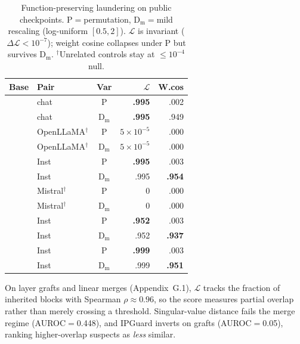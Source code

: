 \documentclass[letterpaper]{article}
\begin{document}
\begin{table}[t]
\centering
\small
\begin{tabular*}{\columnwidth}{@{\extracolsep{\fill}}llcrr@{}}
\toprule
Base & Pair & Var & $\mathcal{L}$ & W.cos \\
\midrule
{}
  & chat & P & \textbf{.995} & .002 \\
  & chat & D$_{\mathrm{m}}$ & \textbf{.995} & .949 \\
  & OpenLLaMA$^\dagger$ & P & $5{\times}10^{-5}$ & .000 \\
  & OpenLLaMA$^\dagger$ & D$_{\mathrm{m}}$ & $5{\times}10^{-5}$ & .000 \\
\midrule
{}
  & Inst & P & \textbf{.995} & .003 \\
  & Inst & D$_{\mathrm{m}}$ & .995 & \textbf{.954} \\
  & Mistral$^\dagger$ & P & $0$ & .000 \\
  & Mistral$^\dagger$ & D$_{\mathrm{m}}$ & $0$ & .000 \\
\midrule
{}
  & Inst & P & \textbf{.952} & .003 \\
  & Inst & D$_{\mathrm{m}}$ & .952 & \textbf{.937} \\
\midrule
{}
  & Inst & P & \textbf{.999} & .003 \\
  & Inst & D$_{\mathrm{m}}$ & .999 & \textbf{.951} \\
\bottomrule
\end{tabular*}
\caption{Function-preserving laundering on public checkpoints. P$=$permutation, D$_{\mathrm{m}}$$=$mild rescaling (log-uniform $[0.5, 2]$). $\mathcal{L}$ is invariant ($\Delta\mathcal{L} < 10^{-7}$); weight cosine collapses under P but survives D$_{\mathrm{m}}$. $^\dagger$Unrelated controls stay at ${\leq}10^{-4}$ null.}
\label{tab:laundering-llm}
\end{table}

On layer grafts and linear merges (Appendix~G.1), $\mathcal{L}$ tracks the fraction of inherited blocks with Spearman $\rho \approx 0.96$, so the score measures partial overlap rather than merely crossing a threshold. Singular-value distance fails the merge regime (AUROC$=$0.448), and IPGuard inverts on grafts (AUROC$=$0.05), ranking higher-overlap suspects as \emph{less} similar.
\end{document}

